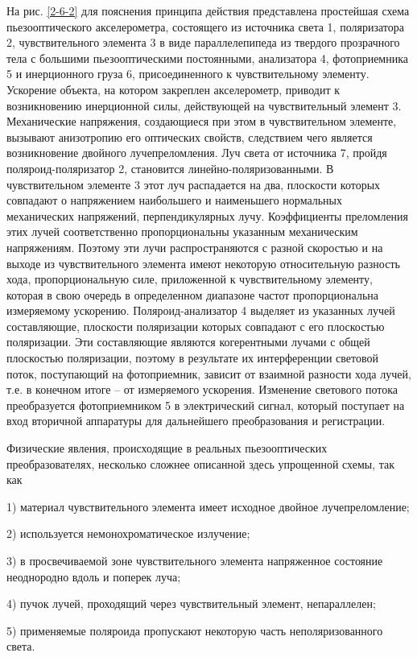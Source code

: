 \documentclass[specialist, subf, href, colorlinks=true, 14pt, final]{disser}
\theoremstyle{definition}
\begin{document}
На рис. \ref{2-6-2} для пояснения принципа действия представлена  простейшая схема пьезооптического акселерометра, состоящего из источника света 1, поляризатора 2, чувствительного элемента 3 в виде параллелепипеда из твердого прозрачного тела с большими пьезооптическими постоянными, анализатора 4, фотоприемника 5 и инерционного груза 6, присоединенного к чувствительному элементу. Ускорение объекта, на котором закреплен акселерометр, приводит к возникновению инерционной силы, действующей на чувствительный элемент 3. Механические напряжения, создающиеся при этом в чувствительном элементе, вызывают анизотропию его оптических свойств, следствием чего является возникновение двойного лучепреломления. Луч света от источника 7, пройдя поляроид-поляризатор 2, становится линейно-поляризованными. В чувствительном элементе 3 этот луч распадается на два, плоскости которых совпадают о напряжением наибольшего и наименьшего нормальных механических напряжений, перпендикулярных лучу. Коэффициенты преломления этих лучей соответственно пропорциональны указанным механическим напряжениям. Поэтому эти лучи распространяются с разной скоростью и на выходе из чувствительного элемента имеют некоторую относительную разность хода, пропорциональную силе, приложенной к чувствительному элементу, которая в свою очередь в определенном диапазоне частот пропорциональна измеряемому ускорению. Поляроид-анализатор 4 выделяет из указанных лучей составляющие, плоскости поляризации которых совпадают с его плоскостью поляризации. Эти составляющие являются когерентными лучами с общей плоскостью поляризации, поэтому в результате их интерференции световой поток, поступающий на фотоприемник, зависит от взаимной разности хода лучей, т.е. в конечном итоге -- от измеряемого ускорения. Изменение светового потока преобразуется фотоприемником 5 в электрический сигнал, который поступает на вход вторичной аппаратуры для дальнейшего преобразования и регистрации.

Физические явления, происходящие в реальных пьезооптических преобразователях, несколько сложнее описанной здесь упрощенной схемы, так как
\par 1) материал чувствительного элемента имеет исходное двойное
лучепреломление;
\par 2) используется немонохроматическое излучение;
\par 3) в просвечиваемой зоне чувствительного элемента напряженное состояние неоднородно вдоль и поперек луча;
\par 4) пучок лучей, проходящий через чувствительный элемент, непараллелен;
\par 5) применяемые поляроида пропускают некоторую часть неполяризованного света.\\
\end{document}
